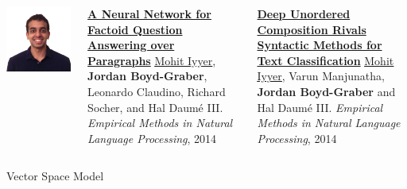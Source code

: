 \documentclass[compress]{beamer}
\newcommand{\gfxq}[2]{
\begin{center}
	\texttt{[image: qb/\#1]}
\end{center}
}
\begin{document}
\begin{frame}{}

  \begin{columns}
        \includegraphics[width=0.7\linewidth]{general_figures/mohit}
        \begin{block}{ {\bf \href{http://cs.colorado.edu/~jbg//docs/2014_emnlp_qb_rnn.pdf}{A Neural Network for Factoid Question Answering over Paragraphs}}}
\underline{\href{http://cs.umd.edu/~miyyer/}{Mohit Iyyer}}, {\bf Jordan Boyd-Graber}, Leonardo Claudino, Richard Socher, and Hal {Daum\'{e} III}.  \emph{Empirical Methods in Natural Language Processing}, 2014
        \end{block}

        \begin{block}{ {\bf \href{file:///Users/jbg/public_html/docs/2015_acl_dan.pdf}{Deep Unordered Composition Rivals Syntactic Methods for Text Classification}}}
\underline{\href{http://cs.umd.edu/~miyyer/}{Mohit Iyyer}}, Varun
Manjunatha, {\bf Jordan Boyd-Graber} and Hal {Daum\'{e} III}.  \emph{Empirical Methods in Natural Language Processing}, 2014
        \end{block}

  \end{columns}
\end{frame}


\begin{frame}{Vector Space Model}

  \only<1>{\gfxq{unigram_models_0}{.8}}
  \only<2>{\gfxq{unigram_models_1}{.8}}
  \only<3>{\gfxq{unigram_models_2}{.8}}
  \only<4>{\gfxq{unigram_models_3}{.8}}
  \only<5>{\gfxq{unigram_models_4}{.8}}
  \only<6>{\gfxq{unigram_models_5}{.8}}
  \only<7>{\gfxq{unigram_models_6}{.8}}
  \only<8>{\gfxq{unigram_models_7}{.8}}
  \only<9>{\gfxq{unigram_models_8}{.8}}


\end{frame}
\end{document}

